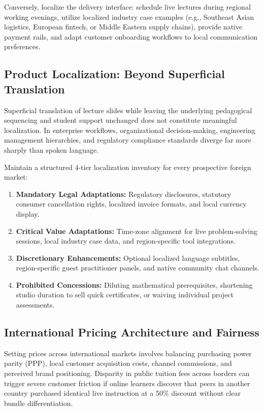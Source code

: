 Conversely, localize the delivery interface: schedule live lectures during regional working evenings, utilize localized industry case examples (e.g., Southeast Asian logistics, European fintech, or Middle Eastern supply chains), provide native payment rails, and adapt customer onboarding workflows to local communication preferences.

\subsection{Product Localization: Beyond Superficial Translation}
\label{sec:product_localization_beyond_translation}

Superficial translation of lecture slides while leaving the underlying pedagogical sequencing and student support unchanged does not constitute meaningful localization. In enterprise workflows, organizational decision-making, engineering management hierarchies, and regulatory compliance standards diverge far more sharply than spoken language.

Maintain a structured 4-tier localization inventory for every prospective foreign market:
\begin{enumerate}
\item \textbf{Mandatory Legal Adaptations:} Regulatory disclosures, statutory consumer cancellation rights, localized invoice formats, and local currency display.
\item \textbf{Critical Value Adaptations:} Time-zone alignment for live problem-solving sessions, local industry case data, and region-specific tool integrations.
\item \textbf{Discretionary Enhancements:} Optional localized language subtitles, region-specific guest practitioner panels, and native community chat channels.
\item \textbf{Prohibited Concessions:} Diluting mathematical prerequisites, shortening studio duration to sell quick certificates, or waiving individual project assessments.
\end{enumerate}

\subsection{International Pricing Architecture and Fairness}
\label{sec:international_pricing_architecture}

Setting prices across international markets involves balancing purchasing power parity (PPP), local customer acquisition costs, channel commissions, and perceived brand positioning. Disparity in public tuition fees across borders can trigger severe customer friction if online learners discover that peers in another country purchased identical live instruction at a 50\% discount without clear bundle differentiation.

